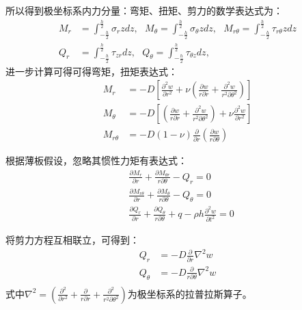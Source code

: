 \documentclass[withoutpreface,bwprint]{cumcmthesis} %
\begin{document}
所以得到极坐标系内力分量：弯矩、扭矩、剪力的数学表达式为：
		\begin{equation}
        \begin{aligned}    
	M_r&=\int_{-\frac{h}{2}}^{\frac{h}{2}}\sigma_r zdz,\:\:\:M_\theta=\int_{-\frac{h}{2}}^{\frac{h}{2}}\sigma_\theta zdz,\:\:\:M_{r\theta}=\int_{-\frac{h}{2}}^{\frac{h}{2}}\tau_{r\theta} zdz\\
	Q_r&=\int_{-\frac{h}{2}}^{\frac{h}{2}}\tau_{zr}dz,\:\:\:Q_\theta=\int_{-\frac{h}{2}}^{\frac{h}{2}}\tau_{\theta z}dz,
         \end{aligned}
	\end{equation}
	进一步计算可得可得弯矩，扭矩表达式：
		\begin{equation}
        \begin{aligned}    
		M_r&=-D[\frac{\partial^2 w}{\partial r^2}+\nu(\frac{\partial w}{r\partial r}+\frac{\partial^2w}{r^2\partial \theta^2})]\\   
		M_\theta&=-D[(\frac{\partial w}{r\partial r}+\frac{\partial^2w}{r^2\partial \theta^2})+\nu\frac{\partial^2 w}{\partial r^2}]\\
		M_{r\theta}&=-D(1-\nu)\frac{\partial}{\partial r}(\frac{\partial w}{r\partial \theta})        \end{aligned}
	\end{equation}
	
	根据薄板假设，忽略其惯性力矩有表达式：
	\begin{equation}	  
        \begin{aligned}
		&\frac{\partial M_r}{\partial r}+\frac{\partial M_{\theta r}}{r\partial \theta}-Q_r=0\\
	&\frac{\partial M_{r\theta}}{\partial r}+\frac{\partial M_{\theta}}{r\partial \theta}-Q_\theta=0\\
	&\frac{\partial Q_r}{\partial r}+\frac{\partial Q_\theta}{r\partial \theta}+q-\rho h\frac{\partial^2w}{\partial t^2}=0
         \end{aligned}
	\end{equation}
 
        将剪力方程互相联立，可得到：
 \begin{equation}
 \begin{aligned}
		Q_r&=-D\frac{\partial}{\partial r}\nabla^2w\\
		Q_\theta&=-D\frac{\partial}{r\partial\theta}\nabla^2w\\
   \end{aligned}
	\end{equation}
	式中$\nabla^2=(\frac{\partial^2}{\partial r^2}+\frac{\partial}{r\partial r}+\frac{\partial^2}{r^2\partial\theta^2})$为极坐标系的拉普拉斯算子。
	
\end{document}
